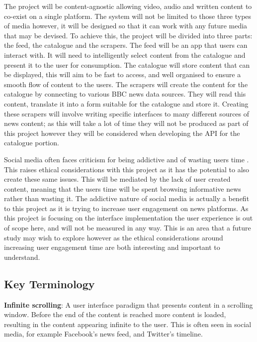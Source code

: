 \documentclass[12pt,titlepage]{article}
\begin{document}
  The project will be content-agnostic allowing video, audio and written content
  to co-exist on a single platform. The system will not be limited to those
  three types of media however, it will be designed so that it can work with any
  future media that may be devised. To achieve this, the project will be divided
  into three parts: the feed, the catalogue and the scrapers. The feed will be
  an app that users can interact with. It will need to intelligently select
  content from the catalogue and present it to the user for consumption. The
  catalogue will store content that can be displayed, this will aim to be fast
  to access, and well organised to ensure a smooth flow of content to the users.
  The scrapers will create the content for the catalogue by connecting to
  various BBC news data sources. They will read this content, translate it into
  a form suitable for the catalogue and store it. Creating these scrapers will
  involve writing specific interfaces to many different sources of news content;
  as this will take a lot of time they will not be produced as part of this
  project however they will be considered when developing the API for the
  catalogue portion.

  Social media often faces criticism for being addictive and of wasting users
  time \citep{neyman}. This raises ethical considerations with this project as
  it has the potential to also create these same issues. This will be mediated
  by the lack of user created content, meaning that the users time will be spent
  browsing informative news rather than wasting it. The addictive nature of
  social media is actually a benefit to this project as it is trying to increase
  user engagement on news platforms. As this project is focusing on the
  interface implementation the user experience is out of scope here, and will
  not be measured in any way. This is an area that a future study may wish to
  explore however as the ethical considerations around increasing user engagement
  time are both interesting and important to understand.

  \subsection{Key Terminology}

  \textbf{Infinite scrolling}: A user interface paradigm that presents content in a
  scrolling window. Before the end of the content is reached more content is
  loaded, resulting in the content appearing infinite to the user. This is often
  seen in social media, for example Facebook's news feed, and Twitter's timeline.
\end{document}
